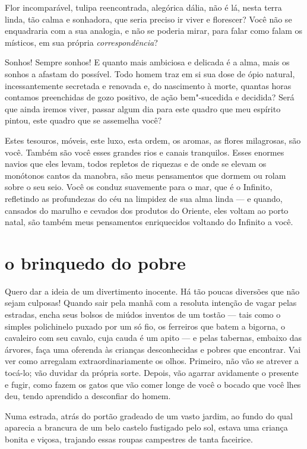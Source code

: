 Flor incomparável, tulipa reencontrada, alegórica dália, não é lá,
nesta terra linda, tão calma e sonhadora, que seria preciso ir viver e
florescer? Você não se enquadraria com a sua analogia, e não se
poderia mirar, para falar como falam os místicos, em sua própria
\textit{correspondência}?

Sonhos! Sempre sonhos! E quanto mais ambiciosa e delicada é a alma, mais
os sonhos a afastam do possível. Todo homem traz em si sua dose de ópio
natural, incessantemente secretada e renovada e, do nascimento à
morte, quantas horas contamos preenchidas de gozo positivo, de
ação bem"-sucedida e decidida? Será que ainda iremos viver, passar algum dia
para este quadro que meu espírito pintou, este quadro que se assemelha
você?

Estes tesouros, móveis, este luxo, esta ordem, os aromas, as
flores milagrosas, são você. Também são você esses grandes rios e
canais tranquilos. Esses enormes navios que eles levam, todos
repletos de riquezas e de onde se elevam os monótonos cantos da
manobra, são meus pensamentos que dormem ou rolam sobre o seu seio.
Você os conduz suavemente para o mar, que é o Infinito, refletindo as
profundezas do céu na limpidez de sua alma linda --- e quando,
cansados do marulho e cevados dos produtos do Oriente, eles voltam ao
porto natal, são também meus pensamentos enriquecidos voltando do
Infinito a você.

\quebra\section[O brinquedo do pobre]{o brinquedo do pobre}

Quero dar a ideia de um divertimento inocente. Há tão poucas diversões
que não sejam culposas! Quando sair pela manhã com a resoluta
intenção de vagar pelas estradas, encha seus bolsos de miúdos
inventos de um tostão --- tais como o simples polichinelo puxado por um
só fio, os ferreiros que batem a bigorna, o cavaleiro com seu cavalo,
cuja cauda é um apito --- e pelas tabernas, embaixo das
árvores, faça uma oferenda às crianças desconhecidas e pobres que
encontrar. Vai ver como arregalam extraordinariamente os olhos.
Primeiro, não vão se atrever a tocá-lo; vão duvidar da própria sorte. Depois, vão agarrar avidamente o presente e fugir, como fazem os
gatos que vão comer longe de você o bocado que você lhes
deu, tendo aprendido a desconfiar do homem.

Numa estrada, atrás do portão gradeado de um vasto jardim, ao fundo do qual aparecia
a brancura de um belo castelo fustigado pelo sol, estava uma
criança bonita e viçosa, trajando essas roupas campestres de tanta
faceirice.

